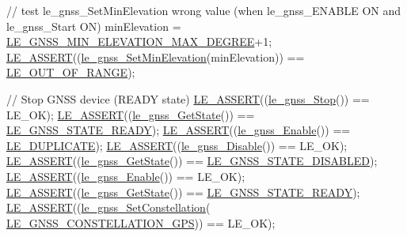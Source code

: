 \begin{DoxyCodeInclude}
{{{{    \textcolor{comment}{// test le\_gnss\_SetMinElevation wrong value (when le\_gnss\_ENABLE ON and le\_gnss\_Start ON)}
    minElevation = \hyperlink{le__gnss__interface_8h_a572e640b32639643c838350241f99b22}{LE\_GNSS\_MIN\_ELEVATION\_MAX\_DEGREE}+1;
    \hyperlink{le__log_8h_ac0dbbef91dc0fed449d0092ff0557b39}{LE\_ASSERT}((\hyperlink{le__gnss__interface_8h_a78982eb8669530eef1bbc79ff79347e4}{le\_gnss\_SetMinElevation}(minElevation)) == 
      \hyperlink{le__basics_8h_a1cca095ed6ebab24b57a636382a6c86caef8ecf11fa8556fd2d3ca8faab697717}{LE\_OUT\_OF\_RANGE});

    \textcolor{comment}{// Stop GNSS device (READY state)}
    \hyperlink{le__log_8h_ac0dbbef91dc0fed449d0092ff0557b39}{LE\_ASSERT}((\hyperlink{le__gnss__interface_8h_a93d63fdc76dbced071956b87de2abff7}{le\_gnss\_Stop}()) == LE\_OK);
    \hyperlink{le__log_8h_ac0dbbef91dc0fed449d0092ff0557b39}{LE\_ASSERT}((\hyperlink{le__gnss__interface_8h_a097601f67898305de45d190e857c6b55}{le\_gnss\_GetState}()) == 
      \hyperlink{le__gnss__interface_8h_a9afbfc8305e79ba6c12f89e2fe9bab7daba105da38c57efe1ee610d92bdfc9d8a}{LE\_GNSS\_STATE\_READY});
    \hyperlink{le__log_8h_ac0dbbef91dc0fed449d0092ff0557b39}{LE\_ASSERT}((\hyperlink{le__gnss__interface_8h_a8e1d96b1b64055b298a74cad1acfbbf8}{le\_gnss\_Enable}()) == \hyperlink{le__basics_8h_a1cca095ed6ebab24b57a636382a6c86cac26034778a666ee720b110c2fb1647ea}{LE\_DUPLICATE});
    \hyperlink{le__log_8h_ac0dbbef91dc0fed449d0092ff0557b39}{LE\_ASSERT}((\hyperlink{le__gnss__interface_8h_aa2cd87c616f968370e9e2113570437ea}{le\_gnss\_Disable}()) == LE\_OK);
    \hyperlink{le__log_8h_ac0dbbef91dc0fed449d0092ff0557b39}{LE\_ASSERT}((\hyperlink{le__gnss__interface_8h_a097601f67898305de45d190e857c6b55}{le\_gnss\_GetState}()) == 
      \hyperlink{le__gnss__interface_8h_a9afbfc8305e79ba6c12f89e2fe9bab7da35b704f64b7bf50e24cbd46357df4485}{LE\_GNSS\_STATE\_DISABLED});
    \hyperlink{le__log_8h_ac0dbbef91dc0fed449d0092ff0557b39}{LE\_ASSERT}((\hyperlink{le__gnss__interface_8h_a8e1d96b1b64055b298a74cad1acfbbf8}{le\_gnss\_Enable}()) == LE\_OK);
    \hyperlink{le__log_8h_ac0dbbef91dc0fed449d0092ff0557b39}{LE\_ASSERT}((\hyperlink{le__gnss__interface_8h_a097601f67898305de45d190e857c6b55}{le\_gnss\_GetState}()) == 
      \hyperlink{le__gnss__interface_8h_a9afbfc8305e79ba6c12f89e2fe9bab7daba105da38c57efe1ee610d92bdfc9d8a}{LE\_GNSS\_STATE\_READY});
    \hyperlink{le__log_8h_ac0dbbef91dc0fed449d0092ff0557b39}{LE\_ASSERT}((\hyperlink{le__gnss__interface_8h_a6dbdc58f23e480e65ea16c583ef5340f}{le\_gnss\_SetConstellation}(
      \hyperlink{le__gnss__interface_8h_adac6fdd4f73229bc9af14e0a11335efcad8f92688bcc53bb744cb1466609d49a7}{LE\_GNSS\_CONSTELLATION\_GPS})) == LE\_OK);
}}}}
\end{DoxyCodeInclude}
